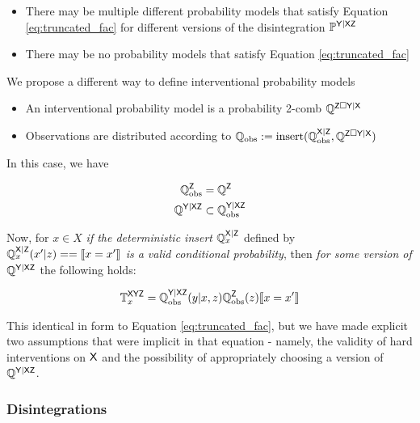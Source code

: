 \begin{itemize}
	\item There may be multiple different probability models that satisfy Equation \ref{eq:truncated_fac} for different versions of the disintegration $\mathbb{P}^{\mathsf{Y|XZ}}$
	\item There may be no probability models that satisfy Equation \ref{eq:truncated_fac}
\end{itemize}

We propose a different way to define interventional probability models

\begin{itemize}
	\item An interventional probability model is a probability 2-comb $\mathbb{Q}^{\mathsf{Z}\square\mathsf{Y}|\mathsf{X}}$
	\item Observations are distributed according to $\mathbb{Q}_{\text{obs}}:=\text{insert}(\mathbb{Q}_{\text{obs}}^{\mathsf{X}|\mathsf{Z}},\mathbb{Q}^{\mathsf{Z}\square\mathsf{Y}|\mathsf{X}})$
\end{itemize}

In this case, we have

\begin{align}
	\mathbb{Q}_{\text{obs}}^{\mathsf{Z}} &= \mathbb{Q}^{\mathsf{Z}}\\
	\mathbb{Q}^{\mathsf{Y}|\mathsf{XZ}}&\subset \mathbb{Q}_{\text{obs}}^{\mathsf{Y}|\mathsf{XZ}}
\end{align}

Now, for $x\in X$ \emph{if the deterministic insert} $\mathbb{Q}_{x}^{\mathsf{X}|\mathsf{Z}}$ defined by $\mathbb{Q}_{x}^{\mathsf{X}|\mathsf{Z}}(x'|z) == \llbracket x=x' \rrbracket$ \emph{is a valid conditional probability}, then \emph{for some version of } $\mathbb{Q}^{\mathsf{Y}|\mathsf{XZ}}$ the following holds:

\begin{align}
	\mathbb{T}_x^{\mathsf{XYZ}} = \mathbb{Q}_{\text{obs}}^{\mathsf{Y|XZ}}(y|x,z)\mathbb{Q}_{\text{obs}}^{\mathsf{Z}}(z)\llbracket x=x' \rrbracket
\end{align}

This identical in form to Equation \ref{eq:truncated_fac}, but we have made explicit two assumptions that were implicit in that equation - namely, the validity of hard interventions on $\mathsf{X}$ and the possibility of appropriately choosing a version of $\mathbb{Q}^{\mathsf{Y}|\mathsf{XZ}}$.


\subsubsection{Disintegrations}

